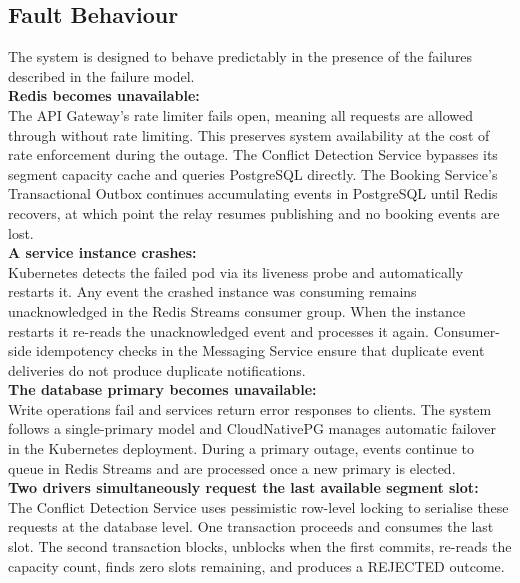 \documentclass{article}
\begin{document}
\subsection{Fault Behaviour}
The system is designed to behave predictably in the presence of the failures described in the failure model.\\

\textbf{Redis becomes unavailable:}\\ The API Gateway's rate limiter fails open, meaning all requests are allowed through without rate limiting. This preserves system availability at the cost of rate enforcement during the outage. The Conflict Detection Service bypasses its segment capacity cache and queries PostgreSQL directly. The Booking Service's Transactional Outbox continues accumulating events in PostgreSQL until Redis recovers, at which point the relay resumes publishing and no booking events are lost.\\

\textbf{A service instance crashes:}\\ Kubernetes detects the failed pod via its liveness probe and automatically restarts it. Any event the crashed instance was consuming remains unacknowledged in the Redis Streams consumer group. When the instance restarts it re-reads the unacknowledged event and processes it again. Consumer-side idempotency checks in the Messaging Service ensure that duplicate event deliveries do not produce duplicate notifications.\\

\textbf{The database primary becomes unavailable:}\\ Write operations fail and services return error responses to clients. The system follows a single-primary model and CloudNativePG manages automatic failover in the Kubernetes deployment. During a primary outage, events continue to queue in Redis Streams and are processed once a new primary is elected.\\

\textbf{Two drivers simultaneously request the last available segment slot:}\\
The Conflict Detection Service uses pessimistic row-level locking to serialise these requests at the database level. One transaction proceeds and consumes the last slot. The second transaction blocks, unblocks when the first commits, re-reads the capacity count, finds zero slots remaining, and produces a REJECTED outcome. \\
\end{document}
